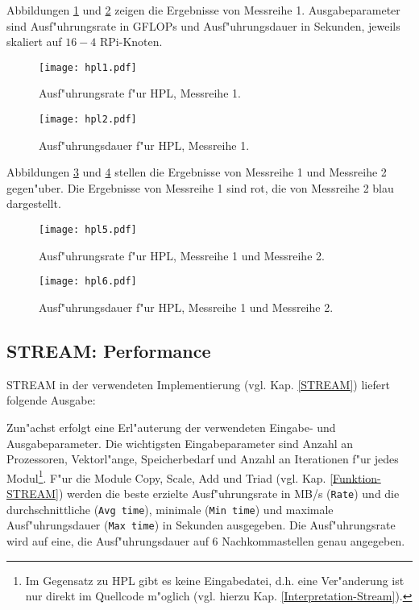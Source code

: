 {Abbildungen \ref{fig:hpl1} und \ref{fig:hpl2} zeigen die Ergebnisse von Messreihe 1. Ausgabeparameter sind Ausf"uhrungsrate in GFLOPs und Ausf"uhrungsdauer in Sekunden, jeweils skaliert auf $16-4$ RPi-Knoten.
\begin{figure}[H]
  \centering
  \texttt{[image: hpl1.pdf]}\\ 
  \caption{Ausf"uhrungsrate f"ur HPL, Messreihe 1.}
  \label{fig:hpl1}		
\end{figure}
\begin{figure}[H]
  \centering
  \texttt{[image: hpl2.pdf]}\\ 
  \caption{Ausf"uhrungsdauer f"ur HPL, Messreihe 1.}
  \label{fig:hpl2}		
\end{figure}
\noindent
Abbildungen \ref{fig:hpl5} und \ref{fig:hpl6} stellen die Ergebnisse von Messreihe 1 und Messreihe 2 gegen"uber. Die Ergebnisse von Messreihe 1 sind rot, die von Messreihe 2 blau dargestellt.
\begin{figure}[htb]
  \centering
  \texttt{[image: hpl5.pdf]}\\ 
  \caption{Ausf"uhrungsrate f"ur HPL, Messreihe 1 und Messreihe 2.}\label{fig:hpl5}
\end{figure}
\begin{figure}[H]
  \centering
  \texttt{[image: hpl6.pdf]}\\ 
  \caption{Ausf"uhrungsdauer f"ur HPL, Messreihe 1 und Messreihe 2.}\label{fig:hpl6}
\end{figure}
\subsection{STREAM: Performance}\label{Ergebnisse-STREAM}
STREAM in der verwendeten Implementierung (vgl. Kap. \ref{STREAM}) liefert folgende Ausgabe:

Zun"achst erfolgt eine Erl"auterung der verwendeten Eingabe- und Ausgabeparameter. Die wichtigsten Eingabeparameter sind Anzahl an Prozessoren, Vektorl"ange, Speicherbedarf und Anzahl an Iterationen f"ur jedes Modul\footnote{Im Gegensatz zu HPL gibt es keine Eingabedatei, d.h. eine Ver"anderung ist nur direkt im Quellcode m"oglich (vgl. hierzu Kap. \ref{Interpretation-Stream}).}. F"ur die Module Copy, Scale, Add und Triad (vgl. Kap. \ref{Funktion-STREAM}) werden die beste erzielte Ausf"uhrungsrate in MB/s (\texttt{Rate}) und die durchschnittliche (\texttt{Avg time}), minimale (\texttt{Min time}) und maximale Ausf"uhrungsdauer (\texttt{Max time}) in Sekunden ausgegeben. Die Ausf"uhrungsrate wird auf eine, die Ausf"uhrungsdauer auf 6 Nachkommastellen genau angegeben. 

}
